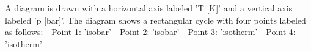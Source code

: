 A diagram is drawn with a horizontal axis labeled 'T [K]' and a vertical axis labeled 'p [bar]'. The diagram shows a rectangular cycle with four points labeled as follows:  
- Point 1: 'isobar'  
- Point 2: 'isobar'  
- Point 3: 'isotherm'  
- Point 4: 'isotherm'